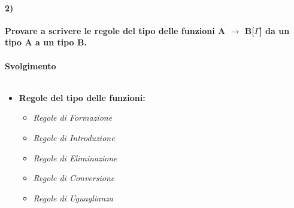 \paragraph{2)}
\textbf{Provare a scrivere le regole del tipo delle funzioni A $\rightarrow$ B[$\Gamma$] da un tipo A a un tipo B.}
\\\\
\noindent
\textbf{Svolgimento}\\\\

\begin{itemize}
\item \textbf{Regole del tipo delle funzioni:}
\begin{itemize}
\item \textit{Regole di Formazione}
\begin{prooftree}
\end{prooftree}

\item \textit{Regole di Introduzione}
\begin{prooftree}
\end{prooftree}

\item \textit{Regole di Eliminazione}
\begin{prooftree}
\end{prooftree}

\item \textit{Regole di Conversione}
\begin{prooftree}
\end{prooftree}

\item \textit{Regole di Uguaglianza}
\begin{prooftree}
\end{prooftree}
\begin{prooftree}
\end{prooftree}
\end{itemize}


\end{itemize}
